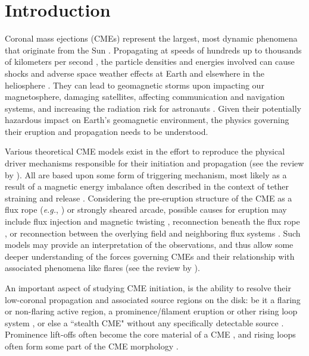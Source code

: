 \documentclass[namedreferences]{solarphysics}
\begin{document}
\begin{article}
\begin{opening}
\end{opening}

%

\section{Introduction}
\label{intro}

Coronal mass ejections (CMEs) represent the largest, most dynamic phenomena that originate from the Sun \cite{2012LRSP....9....3W}. Propagating at speeds of hundreds up to thousands of kilometers per second \cite{2004JGRA..10907105Y}, the particle densities and energies involved can cause shocks and adverse space weather effects at Earth and elsewhere in the heliosphere \cite{2004Natur.432...78P,2005AnGeo..23.1033S,2013NatPh...9..811C,2014NatCo...5E3481L}. They can lead to geomagnetic storms upon impacting our magnetosphere, damaging satellites, affecting communication and navigation systems, and increasing the radiation risk for astronauts \cite{2007A&G....48f..11L}. Given their potentially hazardous impact on Earth's geomagnetic environment, the physics governing their eruption and propagation needs to be understood. 

Various theoretical CME models exist in the effort to reproduce the physical driver mechanisms responsible for their initiation and propagation (see the review by ). All are based upon some form of triggering mechanism, most likely as a result of a magnetic energy imbalance often described in the context of tether straining and release \cite{2001AGUGM.125..143K}. Considering the pre-eruption structure of the CME as a flux rope (\emph{e.g.}, ) or strongly sheared arcade, possible causes for eruption may include flux injection and magnetic twisting \cite{2001ApJ...562.1045K,2006PhRvL..96y5002K}, reconnection beneath the flux rope \cite{1980IAUS...91..207M,1995ApJ...446..377F,2003ApJ...595.1231A,2007ApJ...658L.123L}, or reconnection between the overlying field and neighboring flux systems \cite{1999ApJ...510..485A,2007ApJ...671L..77V,2008ApJ...683.1192L}. Such models may provide an interpretation of the observations, and thus allow some deeper understanding of the forces governing CMEs and their relationship with associated phenomena like flares (see the review by ).

An important aspect of studying CME initiation, is the ability to resolve their low-coronal propagation and associated source regions on the disk: be it a flaring or non-flaring active region, a prominence/filament eruption or other rising loop system \cite{2001ApJ...561..372S,2002ApJ...566L.117Z}, or else a ``stealth CME" without any specifically detectable source \cite{2013SoPh..285..269H}. Prominence lift-offs often become the core material of a CME \cite{2003ApJ...586..562G,2008AnGeo..26.3025F}, and rising loops often form some part of the CME morphology \cite{2004A&A...422..307C,2006A&A...455..339D}.


\end{article}
\end{document}
